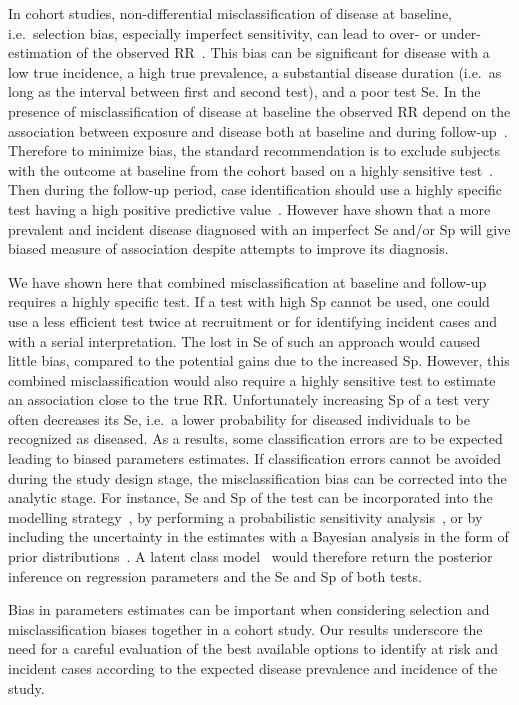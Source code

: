 In cohort studies, non-differential misclassification of disease at baseline,
i.e.\ selection bias, especially imperfect sensitivity, can lead to over- or
under-estimation of the observed RR~\citep{Pekkanen2006}.
This bias can be significant for disease with a low true incidence, a high true
prevalence, a substantial disease duration (i.e.\ as long as the interval between
first and second test), and a poor test Se.
In the presence of misclassification of disease at baseline the observed RR
depend on the association between exposure and disease both at baseline and
during follow-up~\citep{Pekkanen2006}.
Therefore to minimize bias, the standard recommendation is to exclude subjects
with the outcome at baseline from the cohort based on a highly sensitive
test~\citep{Pekkanen2008}.
Then during the follow-up period, case identification should use a highly
specific test having a high positive predictive value~\citep{Brenner1993}.
However \cite{Haine2017} have shown that a more prevalent and incident disease
diagnosed with an imperfect Se and/or Sp will give biased measure of association
despite attempts to improve its diagnosis.

We have shown here that combined misclassification at baseline and follow-up
requires a highly specific test.
If a test with high Sp cannot be used, one could use a less efficient test twice
at recruitment or for identifying incident cases and with a serial
interpretation.
The lost in Se of such an approach would caused little bias, compared to the
potential gains due to the increased Sp.
However, this combined misclassification would also require a highly sensitive
test to estimate an association close to the true RR.
Unfortunately increasing Sp of a test very often decreases its Se, i.e.\ a lower
probability for diseased individuals to be recognized as diseased.
As a results, some classification errors are to be expected leading to biased
parameters estimates.
If classification errors cannot be avoided during the study design stage, the
misclassification bias can be corrected into the analytic stage.
For instance, Se and Sp of the test can be incorporated into the modelling
strategy~\citep{Magder1997}, by performing a probabilistic sensitivity
analysis~\citep{Fox_2005}, or by including the uncertainty in the estimates with
a Bayesian analysis in the form of prior distributions~\citep{McInturff2004}.
A latent class model~\citep{Hui1980} would therefore return the posterior
inference on regression parameters and the Se and Sp of both tests.

Bias in parameters estimates can be important when considering selection and
misclassification biases together in a cohort study.
Our results underscore the need for a careful evaluation of the best available
options to identify at risk and incident cases according to the expected disease
prevalence and incidence of the study. 

